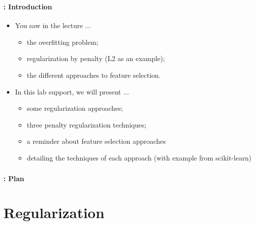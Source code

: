 \documentclass[xcolor=table]{beamer}%
\subtitle[Regularization and feature selection]{Regularization and feature selection}
\begin{document}
	
\begin{frame}
	\frametitle{\inserttitle}
	\framesubtitle{\insertshortsubtitle: Introduction}
	
	\begin{itemize}
		\item You saw in the lecture ...
		\begin{itemize}
			\item the overfitting problem;
			\item regularization by penalty (L2 as an example);
			\item the different approaches to feature selection.
		\end{itemize}
		\item In this lab support, we will present ...
		\begin{itemize}
			\item some regularization approaches;
			\item three penalty regularization techniques;
			\item a reminder about feature selection approaches
			\item detailing the techniques of each approach (with example from scikit-learn)
		\end{itemize}
	\end{itemize}
	
\end{frame}


\begin{frame}
	\frametitle{\inserttitle}
	\framesubtitle{\insertshortsubtitle: Plan}
	
	\begin{multicols}{2}
		\tableofcontents
	\end{multicols}

\end{frame}

\section{Regularization}
\end{document}

